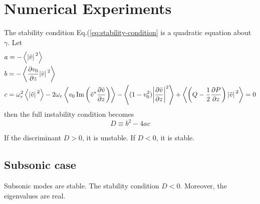 \documentclass{article}
\theoremstyle{plain}
\theoremstyle{definition}
\theoremstyle{remark}
\theoremstyle{remark}
\begin{document}
\section{Numerical Experiments}
The stability condition Eq.(\ref{eq:stability-condition} is a quadratic equation about $\gamma$. Let 
\begin{align*}
    &a = -\expval{\abs*{\tilde{v}}^2} \\
    &b = -\expval{\pdv{v_0}{z}\abs*{\tilde{v}}^2} \\
    &c = \omega_r^2\expval{\abs*{\tilde{v}}^2} 
    - 2\omega_r\expval{v_0 \Im\left(\tilde{v}^*\pdv{\tilde{v}}{z}\right)} 
    - \expval{(1-v_0^2)\abs{\pdv{\tilde{v}}{z}}^2 }
    + \expval{\left(Q-\frac{1}{2}\pdv{P}{z}\right)\abs*{\tilde{v}}^2} = 0
\end{align*}
then the full instability condition becomes 
\[ D \equiv b^2 - 4ac \]

If the discriminant $D>0$, it is unstable. If $D<0$, it is stable. 

\subsection{Subsonic case}
Subsonic modes are stable. The stability condition $D<0$. Moreover, the eigenvalues are real.
\end{document}
